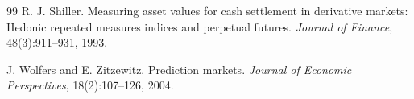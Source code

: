 \documentclass[10pt,twocolumn]{article}
\begin{document}
\begin{thebibliography}{99}
R. J. Shiller.
\newblock Measuring asset values for cash settlement in derivative markets:
Hedonic repeated measures indices and perpetual futures.
\newblock \emph{Journal of Finance}, 48(3):911--931, 1993.

J. Wolfers and E. Zitzewitz.
\newblock Prediction markets.
\newblock \emph{Journal of Economic Perspectives}, 18(2):107--126, 2004.

\end{thebibliography}
\end{document}
